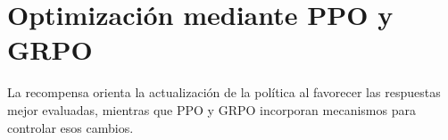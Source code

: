 \section{Optimización mediante PPO y GRPO}
\label{sec:marco-optimizacion}
La recompensa orienta la actualización de la política al favorecer las respuestas mejor evaluadas, mientras que PPO y GRPO incorporan mecanismos para controlar esos cambios.

%
%
%
